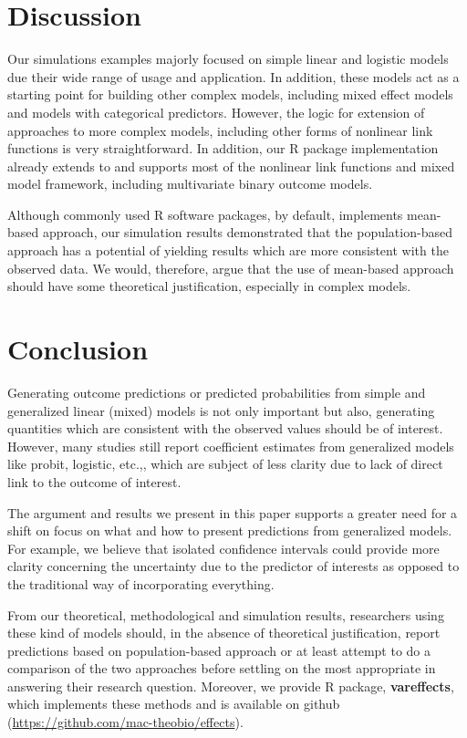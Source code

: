 \documentclass[10pt,letterpaper]{article}
\newcommand{\pkg}[1]{\textbf{#1}}
\let\proglang=\textsf
\begin{document}
\section*{Discussion}

Our simulations examples majorly focused on simple linear and logistic models due their wide range of usage and application. In addition, these models act as a starting point for building other complex models, including mixed effect models and models with categorical predictors. However, the logic for extension of approaches to more complex models, including other forms of nonlinear link functions is very straightforward. In addition, our \proglang{R} package implementation already extends to and supports most of the nonlinear link functions and mixed model framework, including multivariate binary outcome models.

Although commonly used \proglang{R} software packages, by default, implements mean-based approach, our simulation results demonstrated that the population-based approach has a potential of yielding results which are more consistent with the observed data. We would, therefore, argue that the use of mean-based approach should have some theoretical justification, especially in complex models. 

\section*{Conclusion}

Generating outcome predictions or predicted probabilities from simple and generalized linear (mixed) models is not only important but also, generating quantities which are consistent with the observed values should be of interest. However, many studies still report coefficient estimates from generalized models like probit, logistic, etc.,\cite{hanmer2013behind}, which are subject of less clarity due to lack of direct link to the outcome of interest.

The argument and results we present in this paper supports a greater need for a shift on focus on what and how to present predictions from generalized models. For example, we believe that isolated confidence intervals could provide more clarity concerning the uncertainty due to the predictor of interests as opposed to the traditional way of incorporating everything. 

From our theoretical, methodological and simulation results, researchers using these kind of models should, in the absence of theoretical justification, report predictions based on population-based approach or at least attempt to do a comparison of the two approaches before settling on the most appropriate in answering their research question. Moreover, we provide \proglang{R} package, \pkg{vareffects}, which implements these methods and is available on github (\href{https://github.com/mac-theobio/effects}{https://github.com/mac-theobio/effects}).
\end{document}
